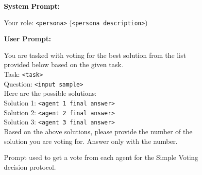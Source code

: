 \begin{figure}[H]
    \centering
    \begin{combinedprompt}
    \textbf{System Prompt:} \\
    \begingroup
    \colorbox{systemcolor}{\parbox{\dimexpr\linewidth-2\fboxsep\relax}{
    Your role: \texttt{<persona>} (\texttt{<persona description>})
    }}
    \endgroup

    \vspace{0.4em} %

    \textbf{User Prompt:} \\
    \begingroup
    \colorbox{usercolor}{\parbox{\dimexpr\linewidth-2\fboxsep\relax}{
    You are tasked with voting for the best solution from the list provided below based on the given task.\\
    Task: \texttt{<task>}\\
    Question: \texttt{<input sample>}\\
    Here are the possible solutions:\\
    Solution 1: \texttt{<agent 1 final answer>}\\
    Solution 2: \texttt{<agent 2 final answer>}\\
    Solution 3: \texttt{<agent 3 final answer>}\\
    Based on the above solutions, please provide the number of the solution you are voting for. Answer only with the number.
    }}
    \endgroup
\end{combinedprompt}
    \caption{Prompt used to get a vote from each agent for the Simple Voting decision protocol.}
    \label{fig:simple_voting_prompt}
\end{figure}

